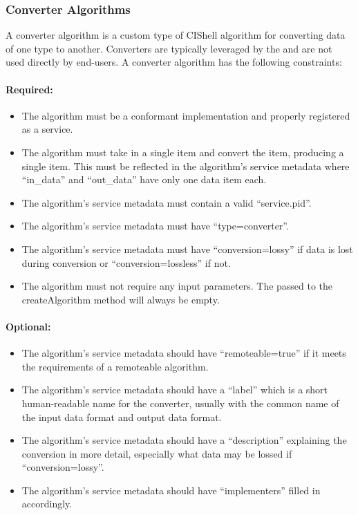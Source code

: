 \subsubsection{Converter Algorithms}
\label{converterAlg}

A converter algorithm is a custom type of CIShell algorithm for converting data
of one type to another. Converters are typically leveraged by the
 and are not used directly by end-users. A converter
algorithm has the following constraints:

\paragraph*{Required:}
\begin{itemize}
  \item The algorithm must be a conformant 
  implementation and properly registered as a service.
  \item The algorithm must take in a single  item and convert the
  item, producing a single  item. This must be reflected in the
  algorithm's service metadata where ``in\_data'' and ``out\_data'' have only
  one data item each.
  \item The algorithm's service metadata must contain a valid ``service.pid''.
  \item The algorithm's service metadata must have ``type=converter''.
  \item The algorithm's service metadata must have ``conversion=lossy'' if
  data is lost during conversion or ``conversion=lossless'' if not.
  \item The algorithm must not require any input parameters. The
   passed to the createAlgorithm method will always be empty.
\end{itemize}

\paragraph*{Optional:}
\begin{itemize}
  \item The algorithm's service metadata should have ``remoteable=true'' if it
  meets the requirements of a remoteable algorithm.
  \item The algorithm's service metadata should have a ``label'' which is a
  short human-readable name for the converter, usually with the common name of
  the input data format and output data format.
  \item The algorithm's service metadata should have a ``description''
  explaining the conversion in more detail, especially what data may be lossed
  if ``conversion=lossy''.
  \item The algorithm's service metadata should have ``implementers'' filled
  in accordingly.  
\end{itemize}

